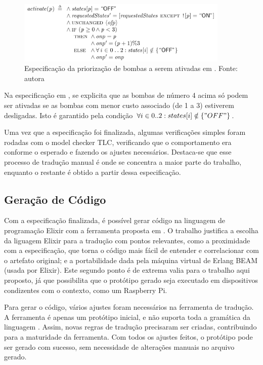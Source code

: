 \documentclass[12pt]{article}
\begin{document}
\begin{figure}[h]
\begin{center}
  \includegraphics[width=0.9\textwidth]{activate_tla.png}
\end{center}
  \caption{Especificação da priorização de bombas a serem ativadas em \TLA.
    Fonte: autora}
  \label{fig:activate_tla}
\end{figure}

Na especificação em \TLA, se explicita que as bombas de número 4 acima só podem
ser ativadas se as bombas com menor custo associado (de 1 a 3) estiverem
desligadas. Isto é garantido pela condição $\forall i \in 0..2 : states[i] \notin \{"OFF"\}$.

Uma vez que a especificação foi finalizada, algumas verificações simples foram
rodadas com o model checker TLC, verificando que o comportamento era conforme o
esperado e fazendo os ajustes necessários. Destaca-se que esse processo de
tradução manual é onde se concentra a maior parte do trabalho, enquanto o
restante é obtido a partir dessa especificação.

\subsection{Geração de Código}

Com a especificação finalizada, é possível gerar código na linguagem de
programação Elixir com a ferramenta proposta em \cite{tcc}. O trabalho justifica
a escolha da liguagem Elixir para a tradução com pontos relevantes, como a
proximidade com a especificação, que torna o código mais fácil de entender e
correlacionar com o artefato original; e a portabilidade dada pela máquina
virtual de Erlang BEAM (usada por Elixir). Este segundo ponto é de extrema valia para
o trabalho aqui proposto, já que possibilita que o protótipo gerado seja
executado em dispositivos condizentes com o contexto, como um Raspberry Pi.

Para gerar o código, vários ajustes foram necessários na ferramenta de tradução.
A ferramenta é apenas um protótipo inicial, e não suporta toda a gramática da
linguagem \TLA. Assim, novas regras de tradução precisaram ser criadas,
contribuindo para a maturidade da ferramenta. Com todos os ajustes feitos, o
protótipo pode ser gerado com sucesso, sem necessidade de alterações manuais
no arquivo gerado.
\end{document}
